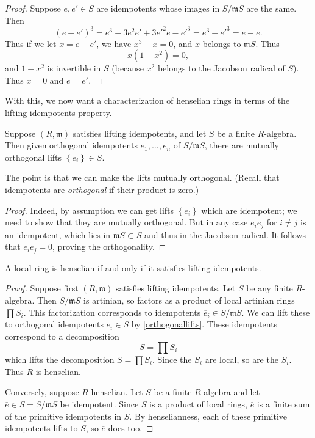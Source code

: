 \begin{proof} 
Suppose $e, e' \in S$ are  idempotents whose images in $S/\mathfrak{m}S$ are the
same. Then 
\[ (e-e')^3 = e^3 -3e^2 e' + 3e'^2 e- e'^3 = e^3 - e'^3 = e - e. \]
Thus if we let $x = e - e'$, we have $x^3 - x =0$, and $x $ belongs to
$\mathfrak{m}S$. Thus
\[ x(1-x^2) = 0,  \]
and $1-x^2$ is invertible in $S$ (because $x^2$ belongs to the Jacobson radical
of $S$). Thus $x =0 $ and $e = e'$.
\end{proof}


With this, we now want a characterization of henselian rings in terms of the
lifting idempotents property.

\begin{proposition} \label{orthogonallifts}
Suppose $(R, \mathfrak{m})$ satisfies lifting idempotents, and let $S$ be a
finite $R$-algebra. Then given
orthogonal idempotents $\overline{e}_1, \dots, \overline{e}_n$ of $S/\mathfrak{m}S$, there are
mutually orthogonal lifts $\left\{e_i\right\} \in S$. 
\end{proposition} 

The point is that we can make the lifts mutually orthogonal. (Recall that
idempotents are \emph{orthogonal} if their product is zero.)
\begin{proof} 
Indeed, by assumption we can get lifts $\left\{e_i\right\}$ which are
idempotent; we need to show that they are mutually orthogonal. But in any case
$e_i e_j$ for $i \neq j$ is an idempotent, which lies in 
$\mathfrak{m}S \subset S$ and thus in the Jacobson radical. It follows that
$e_i e_j = 0$, proving the orthogonality.
\end{proof} 

\begin{proposition} 
A local ring is henselian if and only if it satisfies lifting idempotents. 
\end{proposition}
\begin{proof} 
Suppose first $(R, \mathfrak{m} )$ satisfies lifting idempotents. 
Let $S$ be any finite $R$-algebra. Then $S/\mathfrak{m}S$ is artinian,
so factors as a product of local artinian rings $\prod \overline{S}_i$. This
factorization corresponds to idempotents $\overline{e}_i \in
S/\mathfrak{m}S$.
We can lift these to orthogonal idempotents $e_i \in S$ by
\cref{orthogonallifts}. 
These idempotents correspond to a decomposition 
\[ S = \prod S_i  \]
which lifts the decomposition $\overline{S} = \prod \overline{S}_i$. Since the
$\overline{S_i}$ are local, so are the $S_i$.
Thus $R$ is henselian.

Conversely, suppose $R$ henselian. 
Let $S$ be a finite $R$-algebra and let $\overline{e} \in \overline{S} =
S/\mathfrak{m}S$ be idempotent. Since $\overline{S}$ is a product of local
rings, $\overline{e}$ is a finite sum of the primitive idempotents in
$\overline{S}$. By henselianness, each of these primitive idempotents lifts to
$S$, so $\overline{e}$ does too.
\end{proof}


